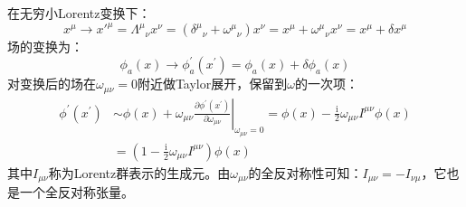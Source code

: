 \documentclass{book}
\begin{document}
在无穷小Lorentz变换下：
\begin{equation}
	x^\mu\to x'^{\mu}=\Lambda^{\mu}{}_{\nu}x^{\nu}=(\delta^{\mu}{}_{\nu}+\omega^{\mu}{}_{\nu})x^{\nu}=x^{\mu}+\omega^{\mu}{}_{\nu}x^{\nu}=x^\mu+\delta x^\mu
\end{equation}
场的变换为：
\begin{equation}
	\phi_a(x)\to \phi^\prime_a(x^\prime)=\phi_a(x)+\delta\phi_a(x)
\end{equation}
对变换后的场在$\omega_{\mu\nu}=0$附近做Taylor展开，保留到$\omega$的一次项：
\begin{equation}
	\begin{aligned}
		\phi^\prime(x^\prime)&\sim\phi(x)+\left. \omega_{\mu\nu}\frac{\partial \phi^\prime(x^\prime)}{\partial\omega_{\mu\nu}}\right|_{\omega_{\mu\nu}=0}=\phi(x)-\frac{\mathrm{i}}{2}\omega_{\mu\nu}I^{\mu\nu}\phi(x) \\&
=\left(1-\frac{\mathrm{i}}{2}\omega_{\mu\nu}I^{\mu\nu}\right)\phi(x)
	\end{aligned}
\end{equation}
其中$I_{\mu\nu}$称为Lorentz群表示的生成元。由$\omega_{\mu\nu}$的全反对称性可知：$I_{\mu\nu}=-I_{\nu\mu}$，它也是一个全反对称张量。
\end{document}
